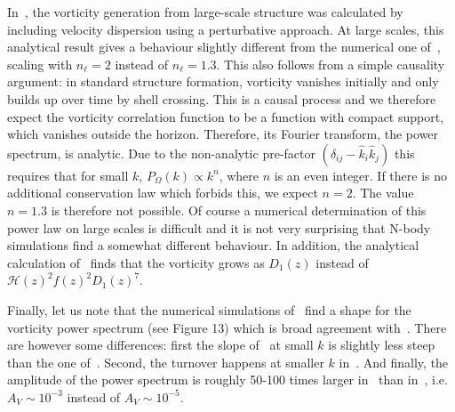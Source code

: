 \documentclass[a4paper,twocolumn,aps,prd,nolongbibliography,superscriptaddress,showpacs,showkeys,amsmath,amssymb,floatfix,nofootinbib]{revtex4-1}
\renewcommand{\[}{\begin{equation}}
\renewcommand{\]}{\end{equation}}
\newcommand{\Hcal}{\mathcal{H}}
\begin{document}
In~\cite{Cusin:2016zvu}, the vorticity generation from large-scale structure was calculated by including velocity dispersion using a perturbative approach. At large scales, this analytical result gives a behaviour slightly different from the numerical one of~\cite{Pueblas:2008uv}, scaling with $n_\ell=2$ instead of $n_\ell=1.3$. This also follows from a simple causality argument: in standard structure formation, vorticity vanishes initially and only 
builds up over time by shell crossing. This is a causal process and we therefore expect the vorticity correlation function to be a function with compact support, which vanishes outside the horizon. Therefore, its Fourier transform, the power spectrum, is analytic. Due to the non-analytic pre-factor $(\delta_{ij} -\hat k_i\hat k_j)$ this requires that for small $k$, 
 $P_\Omega (k) \propto k^n$, where $n$ is an even integer. If there is no additional conservation law which forbids this, we expect $n=2$. The value $n=1.3$ is therefore not possible. Of course a numerical determination of this power law on large scales is difficult and it is not very surprising that N-body simulations find a somewhat  different behaviour.
In addition, the analytical calculation of~\cite{Cusin:2016zvu} finds that the vorticity grows as $D_1(z)$ instead of $\Hcal(z)^2f(z)^2D_1(z)^7$.

Finally, let us note that the numerical simulations of~\cite{Zhu:2017vtj} find a shape for the vorticity power spectrum (see Figure 13) which is broad agreement with~\cite{Pueblas:2008uv}. There are however some differences: first the slope of~\cite{Zhu:2017vtj} at small $k$ is slightly less steep than the one of~\cite{Pueblas:2008uv}. Second, the turnover happens at smaller $k$ in~\cite{Zhu:2017vtj}. And finally, the amplitude of the power spectrum is roughly 50-100 times larger in~\cite{Zhu:2017vtj} than in~\cite{Pueblas:2008uv}, i.e. $A_V\sim 10^{-3}$ instead of $A_V\sim 10^{-5}$.
\end{document}
